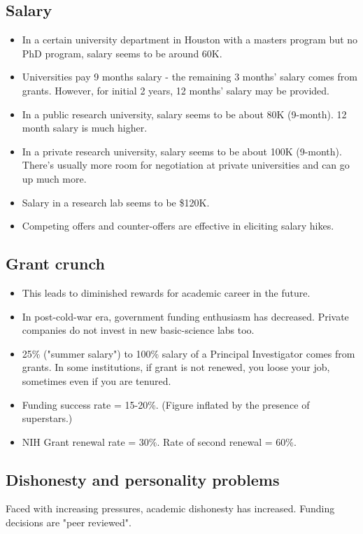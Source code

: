 \documentclass[oneside, article]{memoir}
\begin{document}
\subsection{Salary}
\begin{itemize}

\item In a certain university department in Houston with a masters program but no PhD program, salary seems to be around 60K.
\item Universities pay 9 months salary - the remaining 3 months' salary comes from grants. However, for initial 2 years, 12 months' salary may be provided.
\item In a public research university, salary seems to be about 80K (9-month). 12 month salary is much higher.
\item In a private research university, salary seems to be about 100K (9-month). There's usually more room for negotiation at private universities and can go up much more.
\item Salary in a research lab seems to be \$120K.
\item Competing offers and counter-offers are effective in eliciting salary hikes.
\end{itemize}

\subsection{Grant crunch}
\begin{itemize}

\item This leads to diminished rewards for academic career in the future.
\item In post-cold-war era, government funding enthusiasm has decreased. Private companies do not invest in new basic-science labs too.
\item 25\% ("summer salary") to 100\% salary of a Principal Investigator comes from grants. In some institutions, if grant is not renewed, you loose your job, sometimes even if you are tenured.
\item Funding success rate = 15-20\%. (Figure inflated by the presence of superstars.)
\item NIH Grant renewal rate = 30\%. Rate of second renewal = 60\%.
\end{itemize}

\subsection{Dishonesty and personality problems}
Faced with increasing pressures, academic dishonesty has increased. Funding decisions are "peer reviewed".
\end{document}
